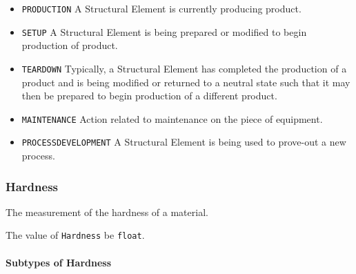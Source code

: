 \begin{itemize}
\item \texttt{PRODUCTION} \newline A \gls{Structural Element} is currently producing product. 
\item \texttt{SETUP} \newline A \gls{Structural Element} is being prepared or modified to begin production of product. 
\item \texttt{TEARDOWN} \newline Typically, a \gls{Structural Element} has completed the production of a product and is being modified or returned to a neutral state such that it may then be prepared to begin production of a different product. 
\item \texttt{MAINTENANCE} \newline Action related to maintenance on the piece of equipment. 
\item \texttt{PROCESS\textunderscore DEVELOPMENT} \newline A \gls{Structural Element} is being used to prove-out a new process. 
\end{itemize}



\subsubsection{Hardness}
\label{sec:Hardness}



The measurement of the hardness of a material.


The value of \texttt{Hardness} \MUST be \texttt{float}.


\paragraph{Subtypes of Hardness}\mbox{}
\label{sec:Subtypes of Hardness}

